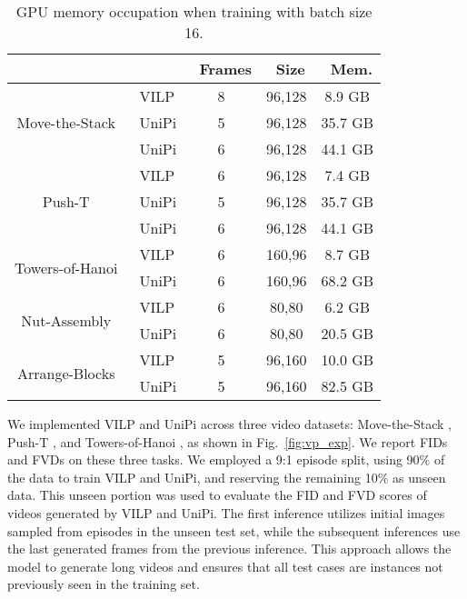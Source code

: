 \documentclass[doublecolumn]{IEEEtran}
\begin{document}
\begin{table}[t]
\centering
\begin{tabular}{clcc|c}
\hline
 & & \ {Frames} & \ {Size} &\ {Mem.} \\
\hline
\multirow{3}{*}{{Move-the-Stack}} & \ {VILP} & 8 & 96,128 & 8.9 GB  \\
                                 & \ {UniPi} & 5& 96,128 & 35.7 GB   \\
                                 &\ {UniPi} & 6& 96,128 & 44.1 GB   \\
\hline
\multirow{3}{*}{{Push-T}} & \ {VILP} & 6 & 96,128&  7.4 GB \\
                                 &\ {UniPi} & 5 & 96,128 & 35.7 GB  \\
                                 &\ {UniPi} & 6 & 96,128 & 44.1 GB  \\
\hline
\multirow{2}{*}{{Towers-of-Hanoi}} & \ {VILP} & 6 & 160,96 & 8.7 GB \\
                                 & \ {UniPi} & 6 & 160,96 & 68.2 GB  \\
\hline
\multirow{2}{*}{{Nut-Assembly}} & \ {VILP} & 6 & 80,80 & 6.2 GB   \\
                                 & \ {UniPi} & 6 & 80,80 & 20.5 GB  \\
\hline
\multirow{2}{*}{{Arrange-Blocks}} & \ {VILP} & 5 & 96,160 & 10.0 GB  \\
                                 & \ {UniPi} & 5 & 96,160 & 82.5 GB  \\
\hline
\end{tabular}
\caption{GPU memory occupation when training with batch size 16. }
\label{tab:video_mem}
\end{table}


We implemented VILP and UniPi across three video datasets: Move-the-Stack \cite{xu2024leto}, Push-T \cite{chi2023diffusionpolicy}, and Towers-of-Hanoi \cite{zeng2021transporter}, as shown in Fig.~\ref{fig:vp_exp}. {We report FIDs and FVDs \cite{yan2021videogpt} on these three tasks.  We employed a 9:1 episode split, using 90\% of the data to train VILP and UniPi, and reserving the remaining 10\% as unseen data. This unseen portion was used to evaluate the FID and FVD scores of videos generated by VILP and UniPi.} The first inference utilizes initial images sampled from episodes in the unseen test set, while the subsequent inferences use the last generated frames from the previous inference. This approach allows the model to generate long videos and ensures that all test cases are instances not previously seen in the training set.
\end{document}

